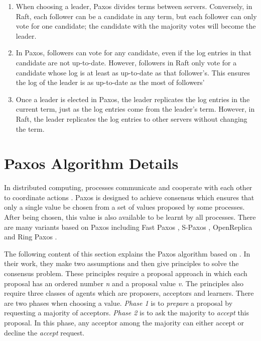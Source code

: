 \documentclass[12pt, a4paper]{article}
\begin{document}
\begin{enumerate}
    \item When choosing a leader, Paxos divides terms between servers.
Conversely, in Raft, each follower can be a candidate in any term,
but each follower can only vote for one candidate; the candidate with the majority votes will become the leader.
    \item In Paxos, followers can vote for any candidate,
even if the log entries in that candidate are not up-to-date.
However, followers in Raft only vote for a candidate
whose log is at least as up-to-date as that follower's.
This ensures the log of the leader is as up-to-date as the most of followers'
    \item Once a leader is elected in Paxos, the leader replicates the log entries in the current term, just as the log entries come from the leader's term. However, in Raft, the leader replicates the log entries to other servers without changing the term.
\end{enumerate}


\section{Paxos Algorithm Details} \label{sec:paxos}

In distributed computing, processes communicate and cooperate with each other to coordinate actions \cite{fischer1983consensus}. Paxos is designed to achieve consensus which ensures that only a single value be chosen from a set of values proposed by some processes. After being chosen, this value is also available to be learnt by all processes. There are many variants based on Paxos \cite{lamport2001paxos} including Fast Paxos \cite{fastpaxos}, S-Paxos \cite{spaxos}, OpenReplica \cite{openreplica} and Ring Paxos \cite{ringpaxos}.

The following content of this section explains the Paxos algorithm based on
\cite{fischer1983consensus}. In their work, they make two assumptions and then give principles to solve the consensus problem.
These principles require a proposal approach in which
each proposal has an ordered number \textit{n} and a proposal value \textit{v}.
The principles also require three classes of agents which
are proposers, acceptors and learners.
There are two phases when choosing a value.
\textit{Phase 1} is to \textit{prepare} a proposal by requesting a majority of acceptors.
\textit{Phase 2} is to ask the majority to \textit{accept} this proposal.
In this phase, any acceptor among the majority can either
accept or decline the \textit{accept} request.
\end{document}
